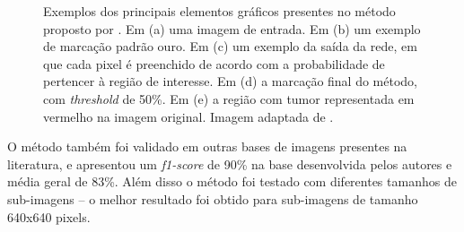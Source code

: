 \begin{figure}[h]
    
    \caption[Principais elementos gráficos presentes no método proposto por \cite{santos2022automated}.]{Exemplos dos principais elementos gráficos presentes no método proposto por \cite{santos2022automated}. Em (a) uma imagem de entrada. Em (b) um exemplo de marcação padrão ouro. Em (c) um exemplo da saída da rede, em que cada pixel é preenchido de acordo com a probabilidade de pertencer à região de interesse. Em (d) a marcação final do método, com \textit{threshold} de 50\%. Em (e) a região com tumor representada em vermelho na imagem original. Imagem adaptada de \cite{santos2022automated}.}
    \label{fig:dali-results}
\end{figure}

O método também foi validado em outras bases de imagens presentes na literatura, e apresentou um \textit{f1-score} de 90\% na base desenvolvida pelos autores e média geral de 83\%. Além disso o método foi testado com diferentes tamanhos de sub-imagens -- o melhor resultado foi obtido para sub-imagens de tamanho 640x640 pixels.

